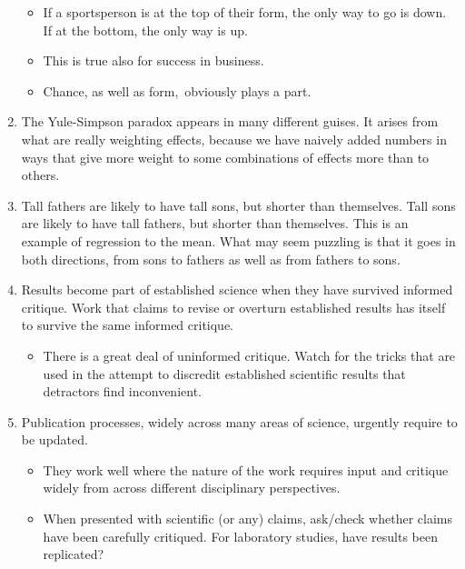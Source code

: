 \documentclass[
  10pt,
  b5paper]{book}
\providecommand{\tightlist}{%
  \setlength{\itemsep}{0pt}\setlength{\parskip}{0pt}}
\begin{document}
\begin{enumerate}
  \begin{itemize}
  \tightlist
  \item
    If a sportsperson is at the top of their form, the only
    way to go is down. If at the bottom, the only way is up.
  \item
    This is true also for success in business.
  \item
    Chance, as well as form,~obviously plays a part.\\
  \end{itemize}
\item
  The Yule-Simpson paradox appears in many different guises.
  It arises from what are really weighting effects, because we
  have naively added numbers in ways that give more weight to
  some combinations of effects more than to others.\\
\item
  Tall fathers are likely to have tall sons, but shorter than themselves.
  Tall sons are likely to have tall fathers, but shorter than themselves.
  This is an example of regression to the mean. What may seem puzzling
  is that it goes in both directions, from sons to fathers as well as from
  fathers to sons.\\
\item
  Results become part of established science when they have
  survived informed critique. Work that claims to revise or overturn
  established results has itself to survive the same informed critique.

  \begin{itemize}
  \tightlist
  \item
    There is a great deal of uninformed critique. Watch for the
    tricks that are used in the attempt to discredit established
    scientific results that detractors find inconvenient.\\
  \end{itemize}
\item
  Publication processes, widely across many areas of science,
  urgently require to be updated.

  \begin{itemize}
  \tightlist
  \item
    They work well where the nature of the work requires input
    and critique widely from across different disciplinary
    perspectives.
  \item
    When presented with scientific (or any) claims, ask/check
    whether claims have been carefully critiqued. For laboratory
    studies, have results been replicated?
  \end{itemize}
\end{enumerate}
\end{document}
